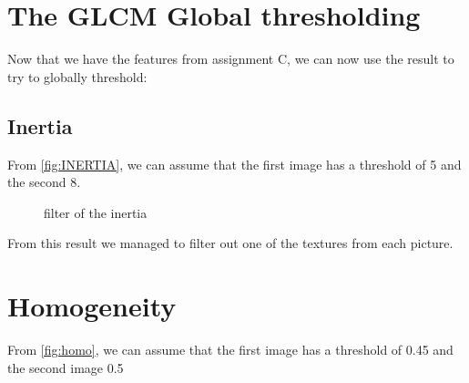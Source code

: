 \documentclass{article}
\begin{document}
\newpage
\section{The GLCM Global thresholding}

	Now that we have the features from assignment C, we can now use the result to try to globally threshold:
\subsection{Inertia}


From \ref{fig:INERTIA}, we can assume that the first image has a threshold of 5 and the second 8.
		 
		 
\begin{figure}[h]%
		\centering
	    \qquad
	    \caption{filter of the inertia}%
    	\label{fig:inertiafilter}%
\end{figure}	

From this result we managed to filter out one of the textures from each picture.

\newpage 
\section{Homogeneity}

From \ref{fig:homo}, we can assume that the first image has a threshold of 0.45 and the second image 0.5
		 
\end{document}
